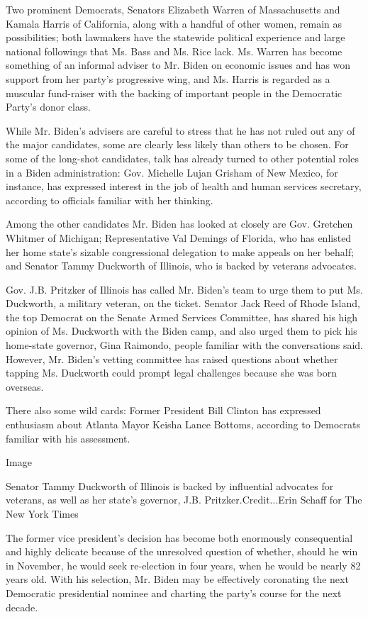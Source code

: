 Two prominent Democrats, Senators Elizabeth Warren of Massachusetts and
Kamala Harris of California, along with a handful of other women, remain
as possibilities; both lawmakers have the statewide political experience
and large national followings that Ms. Bass and Ms. Rice lack. Ms.
Warren has become something of an informal adviser to Mr. Biden on
economic issues and has won support from her party's progressive wing,
and Ms. Harris is regarded as a muscular fund-raiser with the backing of
important people in the Democratic Party's donor class.

While Mr. Biden's advisers are careful to stress that he has not ruled
out any of the major candidates, some are clearly less likely than
others to be chosen. For some of the long-shot candidates, talk has
already turned to other potential roles in a Biden administration: Gov.
Michelle Lujan Grisham of New Mexico, for instance, has expressed
interest in the job of health and human services secretary, according to
officials familiar with her thinking.

Among the other candidates Mr. Biden has looked at closely are Gov.
Gretchen Whitmer of Michigan; Representative Val Demings of Florida, who
has enlisted her home state's sizable congressional delegation to make
appeals on her behalf; and Senator Tammy Duckworth of Illinois, who is
backed by veterans advocates.

Gov. J.B. Pritzker of Illinois has called Mr. Biden's team to urge them
to put Ms. Duckworth, a military veteran, on the ticket. Senator Jack
Reed of Rhode Island, the top Democrat on the Senate Armed Services
Committee, has shared his high opinion of Ms. Duckworth with the Biden
camp, and also urged them to pick his home-state governor, Gina
Raimondo, people familiar with the conversations said. However, Mr.
Biden's vetting committee has raised questions about whether tapping Ms.
Duckworth could prompt legal challenges because she was born overseas.

There also some wild cards: Former President Bill Clinton has expressed
enthusiasm about Atlanta Mayor Keisha Lance Bottoms, according to
Democrats familiar with his assessment.

Image

Senator Tammy Duckworth of Illinois is backed by influential advocates
for veterans, as well as her state's governor, J.B.
Pritzker.Credit...Erin Schaff for The New York Times

The former vice president's decision has become both enormously
consequential and highly delicate because of the unresolved question of
whether, should he win in November, he would seek re-election in four
years, when he would be nearly 82 years old. With his selection, Mr.
Biden may be effectively coronating the next Democratic presidential
nominee and charting the party's course for the next decade.

